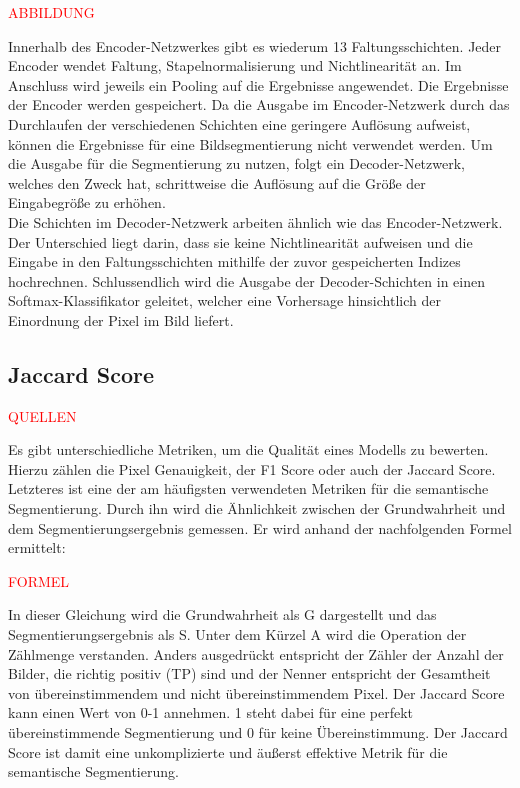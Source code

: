     {\textcolor{red}{ABBILDUNG}}

Innerhalb des Encoder-Netzwerkes gibt es wiederum 13 Faltungsschichten.
Jeder Encoder wendet Faltung, Stapelnormalisierung und Nichtlinearität an.
Im Anschluss wird jeweils ein Pooling auf die Ergebnisse angewendet. Die Ergebnisse der Encoder werden gespeichert.
Da die Ausgabe im Encoder-Netzwerk durch das Durchlaufen der verschiedenen Schichten eine geringere Auflösung aufweist,
können die Ergebnisse für eine Bildsegmentierung nicht verwendet werden.
Um die Ausgabe für die Segmentierung zu nutzen, folgt ein Decoder-Netzwerk, welches den Zweck hat,
schrittweise die Auflösung auf die Größe der Eingabegröße zu erhöhen. \\
Die Schichten im Decoder-Netzwerk arbeiten ähnlich wie das Encoder-Netzwerk.
Der Unterschied liegt darin, dass sie keine Nichtlinearität aufweisen und die Eingabe in den Faltungsschichten
mithilfe der zuvor gespeicherten Indizes hochrechnen. Schlussendlich wird die Ausgabe der Decoder-Schichten in
einen Softmax-Klassifikator geleitet, welcher eine Vorhersage hinsichtlich der Einordnung der Pixel im Bild liefert.

\subsection{Jaccard Score}

{\textcolor{red}{QUELLEN}}

Es gibt unterschiedliche Metriken, um die Qualität eines Modells zu bewerten. Hierzu zählen die Pixel Genauigkeit,
der F1 Score oder auch der Jaccard Score. Letzteres ist eine der am häufigsten verwendeten Metriken
für die semantische Segmentierung.
Durch ihn wird die Ähnlichkeit zwischen der Grundwahrheit und dem Segmentierungsergebnis gemessen.
Er wird anhand der nachfolgenden Formel ermittelt:

{\textcolor{red}{FORMEL}}

In dieser Gleichung wird die Grundwahrheit als G dargestellt und das Segmentierungsergebnis als S.
Unter dem Kürzel A wird die Operation der Zählmenge verstanden. Anders ausgedrückt entspricht der Zähler der Anzahl
der Bilder, die richtig positiv (TP) sind und der Nenner entspricht der Gesamtheit von übereinstimmendem und
nicht übereinstimmendem Pixel. Der Jaccard Score kann einen Wert von 0-1 annehmen.
1 steht dabei für eine perfekt übereinstimmende Segmentierung und 0 für keine Übereinstimmung.
Der Jaccard Score ist damit eine unkomplizierte und äußerst effektive Metrik für die semantische Segmentierung.

